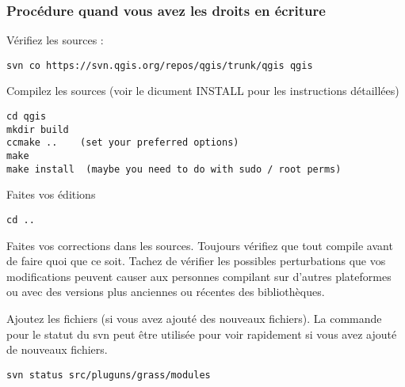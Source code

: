\subsubsection{Proc\'edure quand vous avez les droits en \'ecriture}
V\'erifiez les sources :

\begin{verbatim}
svn co https://svn.qgis.org/repos/qgis/trunk/qgis qgis
\end{verbatim}

Compilez les sources (voir le dicument INSTALL pour les instructions d\'etaill\'ees)

\begin{verbatim}
cd qgis
mkdir build
ccmake ..    (set your preferred options)
make
make install  (maybe you need to do with sudo / root perms)
\end{verbatim}

Faites vos \'editions

\begin{verbatim}
cd ..
\end{verbatim}

Faites vos corrections dans les sources. Toujours v\'erifiez que tout compile avant de faire quoi que ce soit. Tachez de v\'erifier les possibles perturbations que vos modifications peuvent causer aux personnes compilant sur d'autres plateformes ou avec des versions plus anciennes ou r\'ecentes des biblioth\`eques.

Ajoutez les fichiers (si vous avez ajout\'e des nouveaux fichiers). La commande pour le statut du svn peut \^etre utilis\'ee pour voir rapidement si vous avez ajout\'e de nouveaux fichiers.

\begin{verbatim}
svn status src/pluguns/grass/modules
\end{verbatim}

